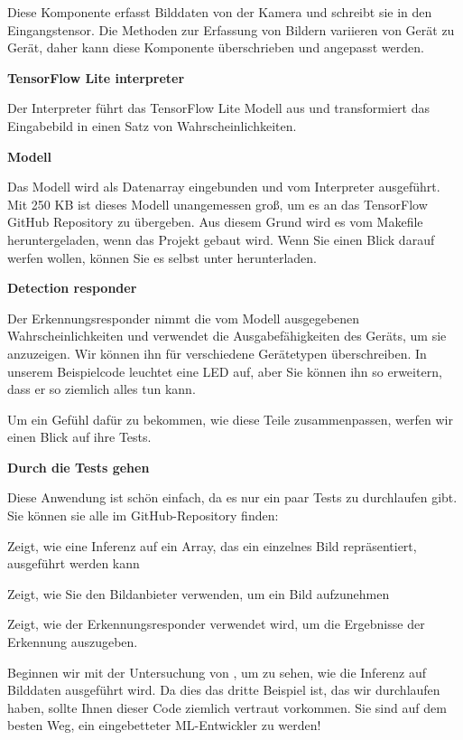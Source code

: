 Diese Komponente erfasst Bilddaten von der Kamera und schreibt sie in den Eingangstensor. Die Methoden zur Erfassung von Bildern variieren von Gerät zu Gerät, daher kann diese Komponente überschrieben und angepasst werden.

\textbf{TensorFlow Lite interpreter}

Der Interpreter führt das TensorFlow Lite Modell aus und transformiert das Eingabebild in einen Satz von Wahrscheinlichkeiten.

\textbf{Modell}

Das Modell wird als Datenarray eingebunden und vom Interpreter ausgeführt. Mit 250 KB ist dieses Modell unangemessen groß, um es an das TensorFlow GitHub Repository zu übergeben. Aus diesem Grund wird es vom Makefile heruntergeladen, wenn das Projekt gebaut wird. Wenn Sie einen Blick darauf werfen wollen, können Sie es selbst unter  herunterladen.

\textbf{Detection responder}


Der Erkennungsresponder nimmt die vom Modell ausgegebenen Wahrscheinlichkeiten und verwendet die Ausgabefähigkeiten des Geräts, um sie anzuzeigen. Wir können ihn für verschiedene Gerätetypen überschreiben. In unserem Beispielcode leuchtet eine LED auf, aber Sie können ihn so erweitern, dass er so ziemlich alles tun kann.

Um ein Gefühl dafür zu bekommen, wie diese Teile zusammenpassen, werfen wir einen Blick auf ihre Tests.

\textbf{Durch die Tests gehen}

Diese Anwendung ist schön einfach, da es nur ein paar Tests zu durchlaufen gibt. Sie können sie alle im GitHub-Repository finden:


Zeigt, wie eine Inferenz auf ein Array, das ein einzelnes Bild repräsentiert, ausgeführt werden kann



Zeigt, wie Sie den Bildanbieter verwenden, um ein Bild aufzunehmen


Zeigt, wie der Erkennungsresponder verwendet wird, um die Ergebnisse der Erkennung auszugeben.

Beginnen wir mit der Untersuchung von , um zu sehen, wie die Inferenz auf Bilddaten ausgeführt wird. Da dies das dritte Beispiel ist, das wir durchlaufen haben, sollte Ihnen dieser Code ziemlich vertraut vorkommen. Sie sind auf dem besten Weg, ein eingebetteter ML-Entwickler zu werden!

